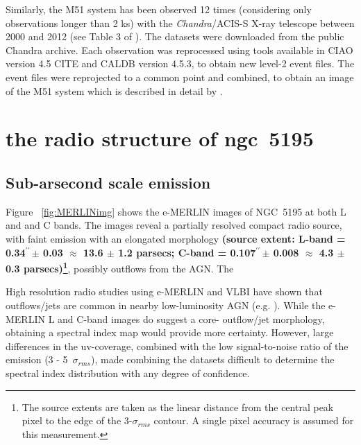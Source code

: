 \documentclass[fleqn,usenatbib]{mnras}
\def\Fig{Figure}
\def\arcs{$^{\prime\prime}\,$}
\begin{document}
{Similarly, the M51 system has been observed 12 times  (considering only observations longer than 2 ks) with the \textit{Chandra}/ACIS-S X-ray telescope between 2000 and 2012 (see Table 3 of \citealt{Rampadarathetal15}). The datasets were downloaded from the public Chandra archive. Each observation was reprocessed using tools available in CIAO version 4.5 CITE and CALDB version 4.5.3, to obtain new level-2 event files. The event files were reprojected to a common point and combined, to obtain an image of the M51 system which is described in detail by \cite{Rampadarathetal15}.}

\section{the radio structure of ngc~5195}

\subsection{Sub-arsecond scale emission}

\Fig~ \ref{fig:MERLINimg} shows the e-MERLIN images of NGC~5195 at both L and  and C bands. The 
images reveal a partially resolved compact radio source, with faint emission with an 
elongated morphology  \textbf{(source extent: L-band = 0.34\arcs $\pm$ 0.03 $\approx$ 13.6 $\pm$ 1.2 parsecs; C-band = 0.107\arcs $\pm$ 0.008 $\approx$ 4.3 $\pm$ 0.3 parsecs)\footnote{The source extents are taken as the linear distance from the central peak pixel to the edge of the 3-$\sigma_{rms}$ contour. A single pixel accuracy is assumed for this measurement.}},  possibly outflows from the AGN. The

High resolution radio studies using 
e-MERLIN and VLBI have shown that outflows/jets are common in nearby low-luminosity AGN (e.g. 
\citealt{Krips+2007,GP09}). While the e-MERLIN L and C-band images do suggest a core-
outflow/jet morphology, obtaining a spectral index map would provide more certainty. However, 
large differences in the uv-coverage, combined with the low signal-to-noise ratio of the 
emission (3 - 5~$\sigma_{rms}$), made combining the datasets difficult to determine the 
spectral index distribution with any degree of confidence. 
\end{document}
